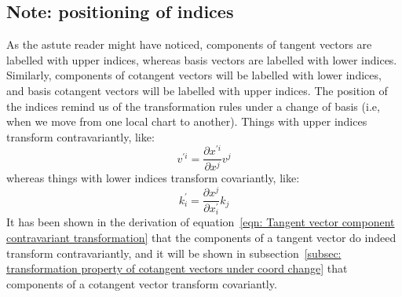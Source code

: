     \subsection{Note: positioning of indices}
      As the astute reader might have noticed, components of tangent vectors
      are labelled with upper indices, whereas basis vectors are labelled with
      lower indices. Similarly, components of cotangent vectors will be
      labelled with lower indices, and basis cotangent vectors will be labelled
      with upper indices. The position of the indices remind us of the
      transformation rules under a change of basis (i.e, when we move from one
      local chart to another). Things with upper indices transform
      contravariantly, like: \[v^{\prime i} = \frac{\partial x^{\prime
      i}}{\partial x^j} v^j\] whereas things with lower indices transform
      covariantly, like: \[k^{\prime}_i = \frac{\partial x^{j}}{\partial
      x^{\prime}_i} k_j \] It has been shown in the derivation of
      equation~\ref{eqn: Tangent vector component contravariant transformation}
      that the components of a tangent vector do indeed transform
      contravariantly, and it will be shown in subsection~\ref{subsec:
      transformation property of cotangent vectors under coord change} that
      components of a cotangent vector transform covariantly.
